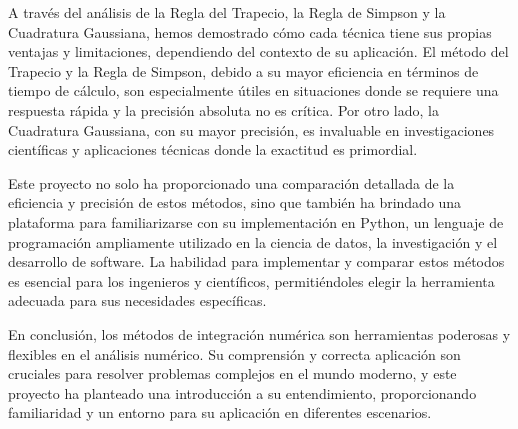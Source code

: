 \documentclass[a4paper]{article}
\begin{document}
    A través del análisis de la Regla del Trapecio, la Regla de Simpson y la Cuadratura Gaussiana, hemos demostrado cómo cada técnica tiene sus propias ventajas y limitaciones, dependiendo del contexto de su aplicación. El método del Trapecio y la Regla de Simpson, debido a su mayor eficiencia en términos de tiempo de cálculo, son especialmente útiles en situaciones donde se requiere una respuesta rápida y la precisión absoluta no es crítica. Por otro lado, la Cuadratura Gaussiana, con su mayor precisión, es invaluable en investigaciones científicas y aplicaciones técnicas donde la exactitud es primordial.
    
    Este proyecto no solo ha proporcionado una comparación detallada de la eficiencia y precisión de estos métodos, sino que también ha brindado una plataforma para familiarizarse con su implementación en Python, un lenguaje de programación ampliamente utilizado en la ciencia de datos, la investigación y el desarrollo de software. La habilidad para implementar y comparar estos métodos es esencial para los ingenieros y científicos, permitiéndoles elegir la herramienta adecuada para sus necesidades específicas.
    
    En conclusión, los métodos de integración numérica son herramientas poderosas y flexibles en el análisis numérico. Su comprensión y correcta aplicación son cruciales para resolver problemas complejos en el mundo moderno, y este proyecto ha planteado una introducción a su entendimiento, proporcionando familiaridad y un entorno para su aplicación en diferentes escenarios.    
    
    \printbibliography
\end{document}
